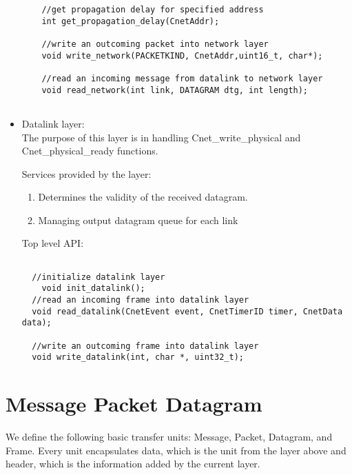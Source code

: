 \documentclass{article}
\begin{document}
\begin{itemize}
\begin{verbatim}
	//get propagation delay for specified address
	int get_propagation_delay(CnetAddr);

	//write an outcoming packet into network layer
	void write_network(PACKETKIND, CnetAddr,uint16_t, char*);

	//read an incoming message from datalink to network layer
	void read_network(int link, DATAGRAM dtg, int length);
    
  \end{verbatim}
		

\item	Datalink layer: \\
		The purpose of this layer is in handling Cnet\_write\_physical and
		Cnet\_physical\_ready functions. 
		
		Services provided by the layer:
    \begin{enumerate}
      \item Determines the validity of the received datagram.
      \item Managing output datagram queue for each link 
    \end{enumerate}
		
		Top level API:

  \begin{verbatim}
  
  //initialize datalink layer
	void init_datalink();
  //read an incoming frame into datalink layer
  void read_datalink(CnetEvent event, CnetTimerID timer, CnetData data);

  //write an outcoming frame into datalink layer
  void write_datalink(int, char *, uint32_t);
  \end{verbatim}

\end{itemize}

\section{Message Packet Datagram}



We define the following basic transfer units: Message, Packet, Datagram, and
Frame. Every unit encapsulates data, which is the unit from the layer above and
header, which is the information added by the current layer. 
\end{document}

